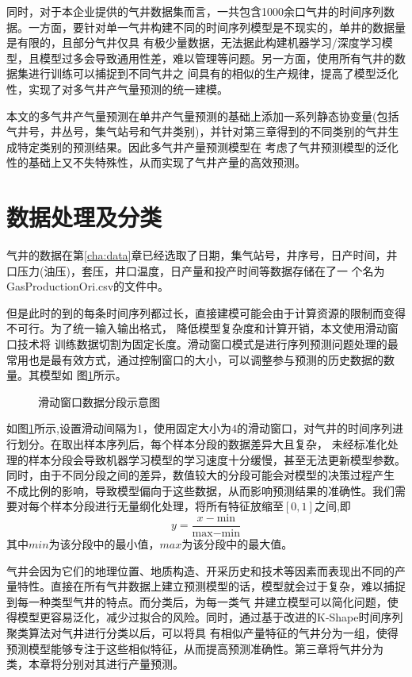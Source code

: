同时，对于本企业提供的气井数据集而言，一共包含1000余口气井的时间序列数据。一方面，要针对单一气井构建不同的时间序列模型是不现实的，单井的数据量是有限的，且部分气井仅具
有极少量数据，无法据此构建机器学习/深度学习模型，且模型过多会导致通用性差，难以管理等问题。另一方面，使用所有气井的数据集进行训练可以捕捉到不同气井之
间具有的相似的生产规律，提高了模型泛化性，实现了对多气井产气量预测的统一建模。

本文的多气井产气量预测在单井产气量预测的基础上添加一系列静态协变量(包括气井号，井丛号，集气站号和气井类别)，并针对第三章得到的不同类别的气井生成特定类别的预测结果。因此多气井产量预测模型在
考虑了气井预测模型的泛化性的基础上又不失特殊性，从而实现了气井产量的高效预测。

\section{数据处理及分类}
\label{sec:datafoc}
气井的数据在第\ref{cha:data}章已经选取了日期，集气站号，井序号，日产时间，井口压力(油压)，套压，井口温度，日产量和投产时间等数据存储在了一
个名为GasProductionOri.csv的文件中。

但是此时的到的每条时间序列都过长，直接建模可能会由于计算资源的限制而变得不可行。为了统一输入输出格式，
降低模型复杂度和计算开销，本文使用滑动窗口技术将
训练数据切割为固定长度。滑动窗口模式是进行序列预测问题处理的最常用也是最有效方式，通过控制窗口的大小，可以调整参与预测的历史数据的数量。其模型如
图\ref{fig:slidewindow}所示。
\begin{figure}[H]
    \label{fig:slidewindow}
    \caption{滑动窗口数据分段示意图}
\end{figure}
如图\ref{fig:slidewindow}所示,设置滑动间隔为1，使用固定大小为4的滑动窗口，对气井的时间序列进行划分。在取出样本序列后，每个样本分段的数据差异大且复杂，
未经标准化处理的样本分段会导致机器学习模型的学习速度十分缓慢，甚至无法更新模型参数。同时，由于不同分段之间的差异，数值较大的分段可能会对模型的决策过程产生
不成比例的影响，导致模型偏向于这些数据，从而影响预测结果的准确性。我们需要对每个样本分段进行无量纲化处理，将所有特征放缩至$[0,1]$之间,即
\begin{equation}
    y = \frac{x - \text{min}}{\text{max} - \text{min}}
\end{equation}
其中$min$为该分段中的最小值，$max$为该分段中的最大值。

气井会因为它们的地理位置、地质构造、开采历史和技术等因素而表现出不同的产量特性。直接在所有气井数据上建立预测模型的话，模型就会过于复杂，难以捕捉到每一种类型气井的特点。而分类后，为每一类气
井建立模型可以简化问题，使得模型更容易泛化，减少过拟合的风险。同时，通过基于改进的K-Shape时间序列聚类算法对气井进行分类以后，可以将具
有相似产量特征的气井分为一组，使得预测模型能够专注于这些相似特征，从而提高预测准确性。第三章将气井分为 类，本章将分别对其进行产量预测。
